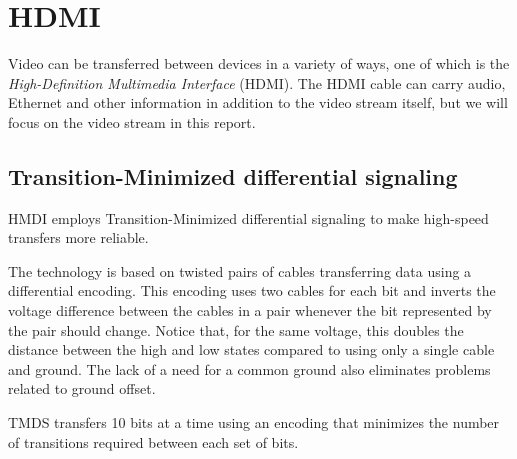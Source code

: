 \section{HDMI}
Video can be transferred between devices in a variety of ways, one of which is the \emph{High-Definition Multimedia Interface} (HDMI).
The HDMI cable can carry audio, Ethernet and other information in addition to the video stream itself, but we will focus on the video stream in this report.

\subsection{Transition-Minimized differential signaling}
HMDI employs Transition-Minimized differential signaling to make high-speed transfers more reliable.

The technology is based on twisted pairs of cables transferring data using a differential encoding.
This encoding uses two cables for each bit and inverts the voltage difference between the cables in a pair whenever the bit represented by the pair should change.
Notice that, for the same voltage, this doubles the distance between the high and low states compared to using only a single cable and ground.
The lack of a need for a common ground also eliminates problems related to ground offset.

TMDS transfers 10 bits at a time using an encoding that minimizes the number of transitions required between each set of bits.
